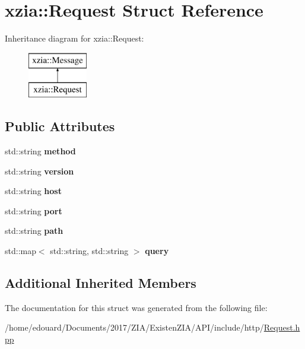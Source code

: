 \hypertarget{structxzia_1_1Request}{}\section{xzia\+:\+:Request Struct Reference}
\label{structxzia_1_1Request}
Inheritance diagram for xzia\+:\+:Request\+:\begin{figure}[H]
\begin{center}
\leavevmode
\includegraphics[height=2.000000cm]{structxzia_1_1Request}
\end{center}
\end{figure}
\subsection*{Public Attributes}
\begin{DoxyCompactItemize}
\item 
\mbox{\label{structxzia_1_1Request_a74e36e609c8c5006d9afb047470ae6d2}} 
std\+::string {\bfseries method}
\item 
\mbox{\label{structxzia_1_1Request_afd11f14da69728f1957678d625cbfc35}} 
std\+::string {\bfseries version}
\item 
\mbox{\label{structxzia_1_1Request_abfa79948642c0dedd46ffd0f2794d884}} 
std\+::string {\bfseries host}
\item 
\mbox{\label{structxzia_1_1Request_a83970c10f1b468d8fc21214187f38fee}} 
std\+::string {\bfseries port}
\item 
\mbox{\label{structxzia_1_1Request_a2994936d8e244e609837ffcf9515d3b4}} 
std\+::string {\bfseries path}
\item 
\mbox{\label{structxzia_1_1Request_a66dacb2e30a35d80485d8366e4bc262b}} 
std\+::map$<$ std\+::string, std\+::string $>$ {\bfseries query}
\end{DoxyCompactItemize}
\subsection*{Additional Inherited Members}


The documentation for this struct was generated from the following file\+:\begin{DoxyCompactItemize}
\item 
/home/edouard/\+Documents/2017/\+Z\+I\+A/\+Existen\+Z\+I\+A/\+A\+P\+I/include/http/\mbox{\hyperlink{Request_8hpp}{Request.\+hpp}}\end{DoxyCompactItemize}

